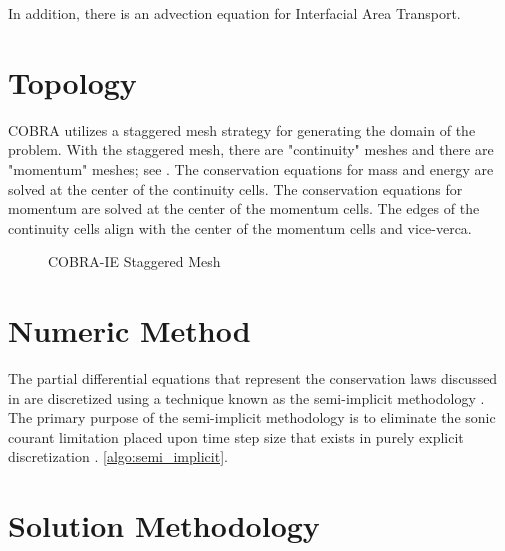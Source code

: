 In addition, there is an advection equation for Interfacial Area Transport.

\section{Topology}
\label{sect:cobra_topology}

COBRA utilizes a staggered mesh strategy for generating the domain of the problem. 
With the staggered mesh, there are "continuity" meshes and there are "momentum" meshes; see .
The conservation equations for mass and energy are solved at the center of the continuity cells.
The conservation equations for momentum are solved at the center of the momentum cells.
The edges of the continuity cells align with the center of the momentum cells and vice-verca.

\begin{figure}[h]
\caption{COBRA-IE Staggered Mesh}
\label{fig:staggered_mesh}
\begin{center}
\end{center}
\end{figure}
 

\section{Numeric Method}
\label{sect:cobra_numeric_method}
The partial differential equations that represent the conservation laws discussed in  are discretized using a technique known as the semi-implicit methodology \cite{Liles1978}.
The primary purpose of the semi-implicit methodology is to eliminate the sonic courant limitation placed upon time step size that exists in purely explicit discretization \cite{someone}. \ref{algo:semi_implicit}.

\section{Solution Methodology}
\label{sect:cobra_solution_methodology}


